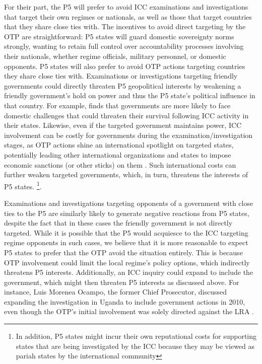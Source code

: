 For their part, the P5 will prefer to avoid ICC examinations and investigations that target their own regimes or nationals, as well as those that target countries that they share close ties with. The incentives to avoid direct targeting by the OTP are straightforward: P5 states will guard domestic sovereignty norms strongly, wanting to retain full control over accountability processes involving their nationals, whether regime officials, military personnel, or domestic opponents. P5 states will also prefer to avoid OTP actions targeting countries they share close ties with. Examinations or investigations targeting friendly governments could directly threaten P5 geopolitical interests by weakening a friendly government's hold on power and thus the P5 state's political influence in that country. For example, \citet{appel2018shadow} finds that governments are more likely to face domestic challenges that could threaten their survival following ICC activity in their states. Likewise, even if the targeted government maintains power, ICC involvement can be costly for governments during the examination/investigation stages, as OTP actions shine an international spotlight on targeted states, potentially leading other international organizations and states to impose economic sanctions (or other sticks) on them \citep{appel2018shadow}. Such international costs can further weaken targeted governments, which, in turn, threatens the interests of P5 states. \footnote{In addition, P5 states might incur their own reputational costs for supporting states that are being investigated by the ICC because they may be viewed as pariah states by the international community}.

Examinations and investigations targeting opponents of a government with close ties to the P5 are similarly likely to generate negative reactions from P5 states, despite the fact that in these cases the friendly government is not directly targeted.  While it is possible that the P5 would acquiesce to the ICC targeting regime opponents in such cases, we believe that it is more reasonable to expect P5 states to prefer that the OTP avoid the situation entirely. This is because OTP involvement could limit the local regime's policy options, which indirectly threatens P5 interests. Additionally, an ICC inquiry could expand to include the government, which might then threaten P5 interests as discussed above. For instance, Luis Morenea Ocampo, the former Chief Prosecutor, discussed expanding the investigation in Uganda to include government actions in 2010, even though the OTP's initial involvement was solely directed against the LRA \citep{gpf10}.

